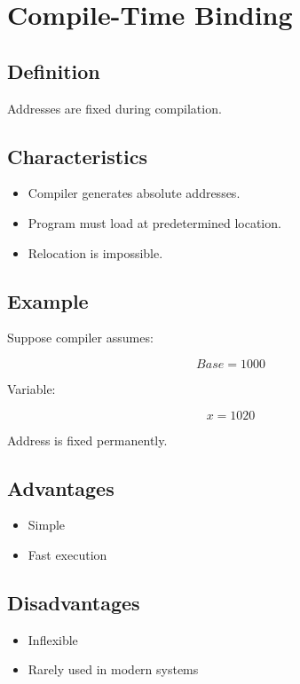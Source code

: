 \section{Compile-Time Binding}

\subsection{Definition}

Addresses are fixed during compilation.

\subsection{Characteristics}

\begin{itemize}
\item Compiler generates absolute addresses.
\item Program must load at predetermined location.
\item Relocation is impossible.
\end{itemize}

\subsection{Example}

Suppose compiler assumes:

\[
Base = 1000
\]

Variable:

\[
x = 1020
\]

Address is fixed permanently.

\subsection{Advantages}

\begin{itemize}
\item Simple
\item Fast execution
\end{itemize}

\subsection{Disadvantages}

\begin{itemize}
\item Inflexible
\item Rarely used in modern systems
\end{itemize}

